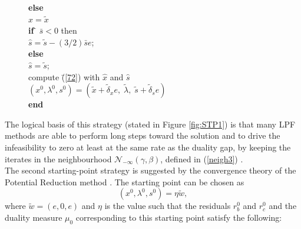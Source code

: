 \documentclass[a4paper,10 pt,titlepage,twoside]{book}
\theoremstyle{plain}
\theoremstyle{definition}
\theoremstyle{remark}
\begin{document}
{{\begin{figure}
{\begin{boxedminipage}{1\linewidth}
\begin{tabbing}
				\textbf{else} \=\\
				\> $\hat{x} = \tilde{x}$\\
				\textbf{if} \= $\bar{s}<0$ then\\
				\> $\hat{s}= \tilde{s} -(3/2)\bar{s}e$;\\
				\textbf{else} \=\\
				\> $\hat{s} = \tilde{s}$;\\
				compute \=(\ref{72}) with $\hat{x}$ and $\hat{s}$\\
				\>$(x^{0}, \lambda^{0}, s^{0}) = (\tilde{x}+\tilde{\delta}_{x} e,\;\tilde{\lambda},\;\tilde{s}+\tilde{\delta}_{s} e)$\\
				\textbf{end}
			\end{tabbing}
		\end{boxedminipage}
		} \quad
\end{figure}
The logical basis of this strategy (stated in Figure \ref{fig:STP1}) is that many LPF methods are able to perform long steps toward the solution and to drive the infeasibility to zero at least at the same rate as the duality gap, by keeping the iterates in the neighbourhood $\mathcal{N}_{-\infty}(\gamma,\beta)$, defined in (\ref{neigh3}) \cite{SPS}.\\[1 cm]
The second starting-point strategy is suggested by the convergence theory of the Potential Reduction method \cite{SPS}. The starting point can be chosen as \begin{equation*}
(x^{0}, \lambda^{0}, s^{0}) = \eta \tilde{w},
\end{equation*}where $\tilde{w} = (e,0,e)$ and $\eta$ is the value such that the residuals $r_{b}^{0}$ and $r_{c}^{0}$ and the duality measure $\mu_{0}$ corresponding to this starting point satisfy the following:

}}
\end{document}
